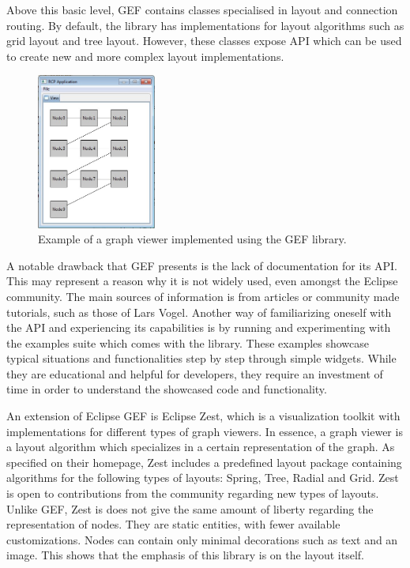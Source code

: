 Above this basic level, GEF contains classes specialised in layout and connection routing. By default, the library has implementations for 
layout algorithms such as grid layout and tree layout. However, these classes expose API which can be used to create new and more complex 
layout implementations.

\begin{figure}[ht] \centering
\includegraphics[width=0.35\textwidth]{img/relatedwork/gefexample.jpg}
\caption{Example of a graph viewer implemented using the GEF library.\protect\footnotemark} \end{figure}

A notable drawback that GEF presents is the lack of documentation for its API. This may represent a reason why it is not widely 
used, even amongst the Eclipse community. The main sources of information is from articles or community made tutorials, such as 
those of Lars Vogel\cite{vogel2014contributing}. Another way of familiarizing oneself with the API and experiencing its capabilities is by running and experimenting 
with the examples suite which comes with the library. These examples showcase typical situations and functionalities step by step through 
simple widgets. While they are educational and helpful for developers, they require an investment of time in order to understand 
the showcased code and functionality.

An extension of Eclipse GEF is Eclipse Zest\cite{zestrelwork}, which is a visualization toolkit with implementations for different types of graph 
viewers. In essence, a graph viewer is a layout algorithm which specializes in a certain representation of the graph. As 
specified on their homepage, Zest includes a predefined layout package containing algorithms for the following types of 
layouts: Spring, Tree, Radial and Grid. Zest is open to contributions from the community regarding new types of layouts.
Unlike GEF, Zest is does not give the same amount of liberty regarding the representation of nodes. They are static entities, with 
fewer available customizations. Nodes can contain only minimal decorations such as text and an image. This shows that the emphasis 
of this library is on the layout itself.

